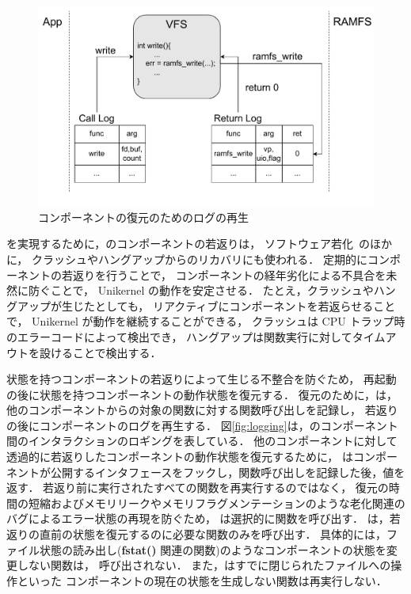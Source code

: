 \begin{figure}[t]
    \centering
    \includegraphics[width=\linewidth]{img/playlog.pdf}
    \caption{コンポーネントの復元のためのログの再生}
    \label{fig:restoration}
\end{figure}

\rr を実現するために，\sysname のコンポーネントの若返りは，
ソフトウェア若化~\cite{HuangEtAl-rejuvenation,CotroneoEtAl-rejuvenation-survey,CotroneoEtAl-Surv14}のほかに，
クラッシュやハングアップからのリカバリにも使われる．
定期的にコンポーネントの若返りを行うことで，
コンポーネントの経年劣化による不具合を未然に防ぐことで，
Unikernel の動作を安定させる．
たとえ，クラッシュやハングアップが生じたとしても，
リアクティブにコンポーネントを若返らせることで，
Unikernel が動作を継続することができる，
クラッシュは CPU トラップ時のエラーコードによって検出でき，
ハングアップは関数実行に対してタイムアウトを設けることで検出する．


状態を持つコンポーネントの若返りによって生じる不整合を防ぐため，
再起動の後に状態を持つコンポーネントの動作状態を復元する．
復元のために，\sysname は，他のコンポーネントからの対象の関数に対する関数呼び出しを記録し，
若返りの後にコンポーネントのログを再生する．
図\ref{fig:logging}は，\sysname のコンポーネント間のインタラクションのロギングを表している．
他のコンポーネントに対して透過的に若返りしたコンポーネントの動作状態を復元するために，
{\sysname} はコンポーネントが公開するインタフェースをフックし，関数呼び出しを記録した後，値を返す．
若返り前に実行されたすべての関数を再実行するのではなく，
復元の時間の短縮およびメモリリークやメモリフラグメンテーションのような老化関連のバグによるエラー状態の再現を防ぐため，
\sysname は選択的に関数を呼び出す．
\sysname は，若返りの直前の状態を復元するのに必要な関数のみを呼び出す．
具体的には，ファイル状態の読み出し(\textbf{fstat()} 関連の関数)のようなコンポーネントの状態を変更しない関数は，
呼び出されない．
また，\sysname はすでに閉じられたファイルへの操作といった
コンポーネントの現在の状態を生成しない関数は再実行しない．

